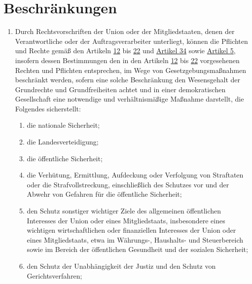 \chapter{Beschränkungen}
\label{ch:23}


\begin{enumerate}

  \item Durch Rechtsvorschriften der Union oder der Mitgliedstaaten, denen der Verantwortliche oder der
   Auftragsverarbeiter unterliegt, können die Pflichten und Rechte gemäß den Artikeln \hyperref[ch:12]
   {12} bis \hyperref[ch:22]{22} und \hyperref[ch:34]{Artikel 34} sowie \hyperref[ch:05]{Artikel 5}, insofern dessen
   Bestimmungen den in den Artikeln \hyperref[ch:12]{12} bis \hyperref[ch:22]{22} vorgesehenen Rechten und Pflichten
   entsprechen, im Wege von Gesetzgebungsmaßnahmen beschränkt werden, sofern eine solche Beschränkung den Wesensgehalt
   der Grundrechte und Grundfreiheiten achtet und in einer demokratischen Gesellschaft eine notwendige und
   verhältnismäßige Maßnahme darstellt, die Folgendes sicherstellt:
  \label{itm:23-1}

  \begin{enumerate}
  
    \item die nationale Sicherheit;
    \label{itm:23-1a}

    \item die Landesverteidigung;
    \label{itm:23-1b}

    \item die öffentliche Sicherheit;
    \label{itm:23-1c}

    \item die Verhütung, Ermittlung, Aufdeckung oder Verfolgung von Straftaten oder die Strafvollstreckung,
     einschließlich des Schutzes vor und der Abwehr von Gefahren für die öffentliche Sicherheit;
    \label{itm:23-1d}

    \item den Schutz sonstiger wichtiger Ziele des allgemeinen öffentlichen Interesses der Union oder eines
     Mitgliedstaats, insbesondere eines wichtigen wirtschaftlichen oder finanziellen Interesses der Union oder eines
     Mitgliedstaats, etwa im Währungs-, Haushalts- und Steuerbereich sowie im Bereich der öffentlichen Gesundheit und
     der sozialen Sicherheit;
    \label{itm:23-1e}

    \item den Schutz der Unabhängigkeit der Justiz und den Schutz von Gerichtsverfahren;
    \label{itm:23-1f}


\end{enumerate}
\end{enumerate}
